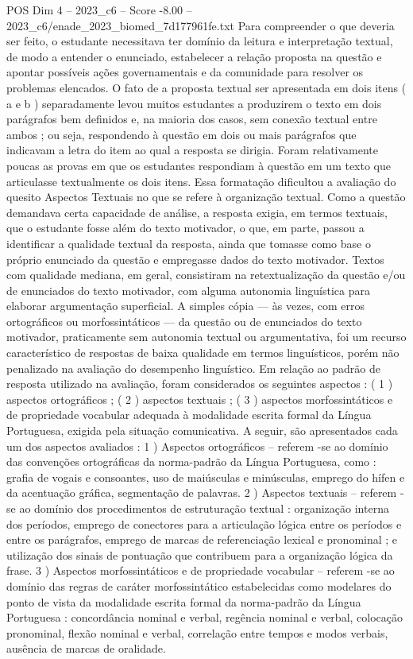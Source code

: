 \begin{textsample}{POS Dim 4 – 2023\_c6 – Score -8.00 – 2023\_c6/enade\_2023\_biomed\_7d177961fe.txt}
Para compreender o que deveria ser feito, o estudante necessitava ter domínio da leitura e interpretação textual, de modo a entender o enunciado, estabelecer a relação proposta na questão e apontar possíveis ações governamentais e da comunidade para resolver os problemas elencados.
O fato de a proposta textual ser apresentada em dois itens ( a e b ) separadamente levou muitos estudantes a produzirem o texto em dois parágrafos bem definidos e, na maioria dos casos, sem conexão textual entre ambos ; ou seja, respondendo à questão em dois ou mais parágrafos que indicavam a letra do item ao qual a resposta se dirigia.
Foram relativamente poucas as provas em que os estudantes respondiam à questão em um texto que articulasse textualmente os dois itens.
Essa formatação dificultou a avaliação do quesito Aspectos Textuais no que se refere à organização textual.
Como a questão demandava certa capacidade de análise, a resposta exigia, em termos textuais, que o estudante fosse além do texto motivador, o que, em parte, passou a identificar a qualidade textual da resposta, ainda que tomasse como base o próprio enunciado da questão e empregasse dados do texto motivador.
Textos com qualidade mediana, em geral, consistiram na retextualização da questão e/ou de enunciados do texto motivador, com alguma autonomia linguística para elaborar argumentação superficial.
A simples cópia — às vezes, com erros ortográficos ou morfossintáticos — da questão ou de enunciados do texto motivador, praticamente sem autonomia textual ou argumentativa, foi um recurso característico de respostas de baixa qualidade em termos linguísticos, porém não penalizado na avaliação do desempenho linguístico.
Em relação ao padrão de resposta utilizado na avaliação, foram considerados os seguintes aspectos : ( 1 ) aspectos ortográficos ; ( 2 ) aspectos textuais ; ( 3 ) aspectos morfossintáticos e de propriedade vocabular adequada à modalidade escrita formal da Língua Portuguesa, exigida pela situação comunicativa.
A seguir, são apresentados cada um dos aspectos avaliados : 1 ) Aspectos ortográficos – referem -se ao domínio das convenções ortográficas da norma-padrão da Língua Portuguesa, como : grafia de vogais e consoantes, uso de maiúsculas e minúsculas, emprego do hífen e da acentuação gráfica, segmentação de palavras. 2 ) Aspectos textuais – referem -se ao domínio dos procedimentos de estruturação textual : organização interna dos períodos, emprego de conectores para a articulação lógica entre os períodos e entre os parágrafos, emprego de marcas de referenciação lexical e pronominal ; e utilização dos sinais de pontuação que contribuem para a organização lógica da frase. 3 ) Aspectos morfossintáticos e de propriedade vocabular – referem -se ao domínio das regras de caráter morfossintático estabelecidas como modelares do ponto de vista da modalidade escrita formal da norma-padrão da Língua Portuguesa : concordância nominal e verbal, regência nominal e verbal, colocação pronominal, flexão nominal e verbal, correlação entre tempos e modos verbais, ausência de marcas de oralidade.

\end{textsample}
